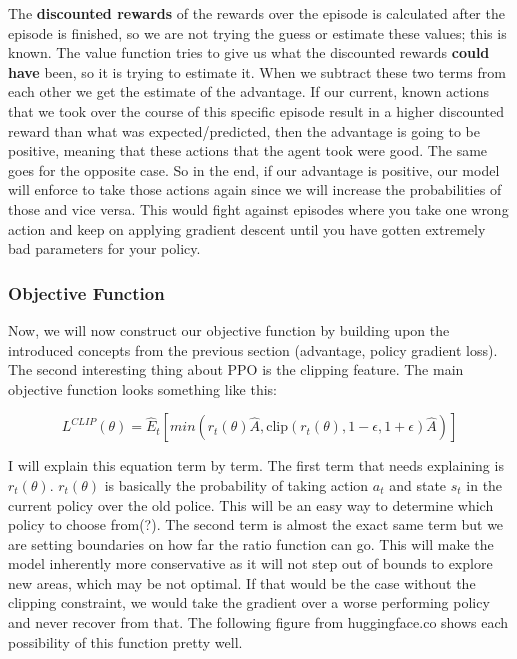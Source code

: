 \documentclass{article}
\numberwithin{equation}{section}
\numberwithin{equation}{section}
\begin{document}
The \textbf{discounted rewards} of the rewards over the episode is calculated after the episode is finished, so we are not trying the guess or estimate these values; this is known. The value function tries to give us what the discounted rewards \textbf{could have} been, so it is trying to estimate it. When we subtract these two terms from each other we get the estimate of the advantage. If our current, known actions that we took over the course of this specific episode result in a higher discounted reward than what was expected/predicted, then the advantage is going to be positive, meaning that these actions that the agent took were good. The same goes for the opposite case. So in the end, if our advantage is positive, our model will enforce to take those actions again since we will increase the probabilities of those and vice versa. This would fight against episodes where you take one wrong action and keep on applying gradient descent until you have gotten extremely bad parameters for your policy.



\subsubsection*{Objective Function}
Now, we will now construct our objective function by building upon the introduced concepts from the previous section (advantage, policy gradient loss). The second interesting thing about PPO is the clipping feature. The main objective function looks something like this:

$$
L^{CLIP}(\theta) = \hat{E}_t \left[ min \left(r_t(\theta) \hat{A}, \text{clip} \left( r_t(\theta),1-\epsilon, 1+\epsilon \right) \hat{A} \right) \right] 
$$

I will explain this equation term by term. The first term that needs explaining is $r_t(\theta)$. $r_t(\theta)$ is basically the probability of taking action $a_t$ and state $s_t$ in the current policy over the old police. This will be an easy way to determine which policy to choose from(?). The second term is almost the exact same term but we are setting boundaries on how far the ratio function can go. This will make the model inherently more conservative as it will not step out of bounds to explore new areas, which may be not optimal. If that would be the case without the clipping constraint, we would take the gradient over a worse performing policy and never recover from that. The following figure from huggingface.co shows each possibility of this function pretty well.
\end{document}
